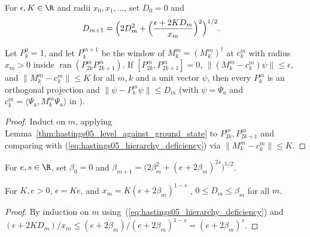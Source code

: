 \begin{definition}
    \label{def:hastings05_hierarchy_deficiency}
    \leanok
    For $\epsilon,K\in\R$ and radii $x_0,x_1,\dots$, set $D_0=0$ and
    \begin{align}
        D_{m+1} & =\Bigl(2D_m^2+\Bigl(\frac{\epsilon+2KD_m}{x_m}\Bigr)^2
        \Bigr)^{1/2}.
        \label{eq:hastings05_hierarchy_deficiency}
    \end{align}
\end{definition}

\begin{theorem}
    \label{thm:hastings05_hierarchy_levels}
    \leanok
    Let $P_k^0=1$, and let $P_k^{m+1}$ be the window of $M_k^m=(M_k^m)^\dagger$
    at $c_k^m$ with radius $x_m>0$ inside $\operatorname{ran}(P_{2k}^mP_{2k+1}^m)$.
    If $[P_{2k}^m,P_{2k+1}^m]=0$, $\lVert(M_k^m-c_k^m)\psi\rVert\le\epsilon$,
    and $\lVert M_k^m-c_k^m\rVert\le K$ for all $m,k$ and a unit vector $\psi$,
    then every $P_k^m$ is an orthogonal projection and
    $\lVert\psi-P_k^m\psi\rVert\le D_m$ (with $\psi=\Psi_a$ and
    $c_k^m=\langle\Psi_a,M_k^m\Psi_a\rangle$ in
    \cite[lines 668--707]{Hastings2006Solving}).
\end{theorem}
\begin{proof}\leanok
    Induct on $m$, applying Lemma~\ref{thm:hastings05_level_against_ground_state}
    to $P_{2k}^m,P_{2k+1}^m$ and comparing with
    (\ref{eq:hastings05_hierarchy_deficiency}) via
    $\lVert M_k^m-c_k^m\rVert\le K$.
\end{proof}

\begin{definition}
    \label{def:hastings05_hierarchy_majorant}
    \leanok
    For $e,s\in\R$, set $\beta_0=0$ and
    $\beta_{m+1}=\bigl(2\beta_m^2+(e+2\beta_m)^{2s}\bigr)^{1/2}$.
\end{definition}

\begin{lemma}
    \label{thm:hastings05_hierarchy_source_radii}
    \leanok
    For $K,e>0$, $\epsilon=Ke$, and $x_m=K(e+2\beta_m)^{1-s}$
    \cite[lines 676--681]{Hastings2006Solving}, $0\le D_m\le\beta_m$ for all $m$.
\end{lemma}
\begin{proof}\leanok
    By induction on $m$ using~(\ref{eq:hastings05_hierarchy_deficiency}) and
    $(\epsilon+2KD_m)/x_m\le(e+2\beta_m)/(e+2\beta_m)^{1-s}=(e+2\beta_m)^s$.
\end{proof}

